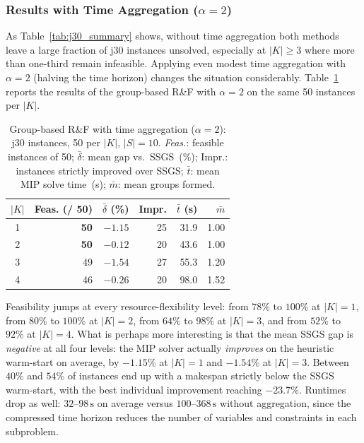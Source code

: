 \subsubsection*{Results with Time Aggregation ($\alpha = 2$)}
As Table~\ref{tab:j30_summary} shows, without time aggregation
both methods leave a large fraction of j30 instances unsolved,
especially at $|K| \geq 3$ where more than one-third remain
infeasible. Applying even modest time aggregation with
$\alpha = 2$ (halving the time horizon) changes the situation
considerably. Table~\ref{tab:j30_alpha2} reports the results of
the group-based R\&F with $\alpha = 2$ on the same 50 instances
per $|K|$.
\begin{table}[htbp]
\centering
\renewcommand{\arraystretch}{1.35}
\caption{Group-based R\&F with time aggregation ($\alpha=2$):
         j30 instances, 50 per $|K|$, $|S|=10$.
         \emph{Feas.}: feasible instances of 50;
         $\bar{\delta}$: mean gap vs.\ SSGS~(\%);
         Impr.: instances strictly improved over SSGS;
         $\bar{t}$: mean MIP solve time~(s);
         $\bar{m}$: mean groups formed.}
\label{tab:j30_alpha2}
\begin{tabular}{c r r r r r}
\hline
$|K|$ &
\textbf{Feas.} (/ 50) &
$\bar{\delta}$ (\%) &
\textbf{Impr.} &
$\bar{t}$ (s) &
$\bar{m}$ \\
\hline
1 & \textbf{50} & $-1.15$ & 25 & 31.9 & 1.00 \\
2 & \textbf{50} & $-0.12$ & 20 & 43.6 & 1.00 \\
3 & 49 & $-1.54$ & 27 & 55.3 & 1.20 \\
4 & 46 & $-0.26$ & 20 & 98.0 & 1.52 \\
\hline
\end{tabular}
\end{table}
Feasibility jumps at every resource-flexibility level: from
$78\%$ to $100\%$ at $|K|=1$, from $80\%$ to $100\%$ at
$|K|=2$, from $64\%$ to $98\%$ at $|K|=3$, and from $52\%$ to
$92\%$ at $|K|=4$. What is perhaps more interesting is that the
mean SSGS gap is \emph{negative} at all four levels: the MIP
solver actually \emph{improves} on the heuristic warm-start on
average, by $-1.15\%$ at $|K|=1$ and $-1.54\%$ at $|K|=3$.
Between $40\%$ and $54\%$ of instances end up with a makespan
strictly below the SSGS warm-start, with the best individual
improvement reaching $-23.7\%$. Runtimes drop as well:
$32$--$98\,\text{s}$ on average versus $100$--$368\,\text{s}$
without aggregation, since the compressed time horizon reduces
the number of variables and constraints in each subproblem.
